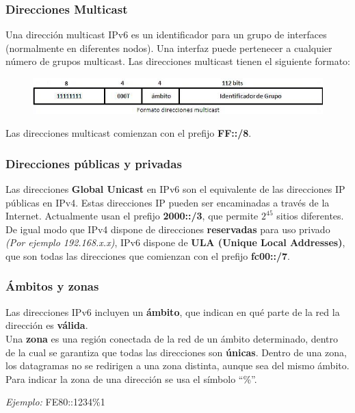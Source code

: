 \begin{onepage}


\subsubsection{Direcciones Multicast}
Una dirección multicast IPv6 es un identificador para un grupo de interfaces (normalmente en diferentes nodos). Una interfaz puede pertenecer a cualquier número de grupos multicast. Las direcciones multicast tienen el siguiente formato:

\begin{figure}[H]
    \centering \includegraphics[width=\textwidth]{img/IPv6_MULTI.jpg}
\end{figure}

Las direcciones multicast comienzan con el prefijo \textbf{FF::/8}.
\subsubsection{Direcciones públicas y privadas}
Las direcciones \textbf{Global Unicast} en IPv6 son el equivalente de las direcciones IP públicas en IPv4. Estas direcciones IP pueden ser encaminadas a través de la Internet. Actualmente usan el prefijo \textbf{2000::/3}, que permite $2^{45}$ sitios diferentes.\\


De igual modo que IPv4 dispone de direcciones \textbf{reservadas} para uso privado \textit{(Por ejemplo 192.168.x.x)}, IPv6 dispone de \textbf{ULA (Unique Local Addresses)}, que son todas las direcciones que comienzan con el prefijo \textbf{fc00::/7}.
\subsubsection{Ámbitos y zonas}
Las direcciones IPv6 incluyen un \textbf{ámbito}, que indican en qué parte de la red la dirección es \textbf{válida}.\\

Una \textbf{zona} es una región conectada de la red de un ámbito determinado, dentro de la cual se garantiza que todas las direcciones son \textbf{únicas}. Dentro de una zona, los datagramas no se redirigen a una zona distinta, aunque sea del mismo ámbito. Para indicar la zona de una dirección se usa el símbolo \enquote{\%}.
\begin{center}
    \textit{Ejemplo: }FE80::1234\%1
\end{center}
\end{onepage}

